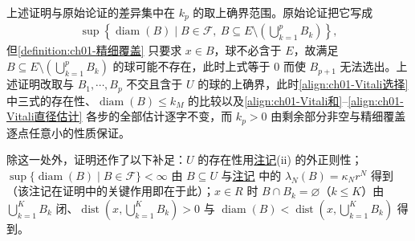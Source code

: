 \documentclass[../../main.tex]{subfiles}%
\begin{document}
\begin{remark}\label{remark:ch01-Vitali证明说明}
上述证明与原始论证的差异集中在 $k_p$ 的取上确界范围。原始论证把它写成
\begin{align*}
\sup\left\{\operatorname{diam}(B)\mid B\in\mathcal{F},\ B\subseteq E\setminus\left(\bigcup_{k=1}^pB_k\right)\right\},
\end{align*}
但\cref{definition:ch01-精细覆盖} 只要求 $x\in B$，球不必含于 $E$，故满足 $B\subseteq E\setminus(\bigcup_{k=1}^pB_k)$ 的球可能不存在，此时上式等于 $0$ 而使 $B_{p+1}$ 无法选出。上述证明改取与 $B_1,\cdots ,B_p$ 不交且含于 $U$ 的球的上确界，此时\eqref{align:ch01-Vitali选择} 中三式的存在性、$\operatorname{diam}(B)\leqslant k_M$ 的比较以及\eqref{align:ch01-Vitali和}--\eqref{align:ch01-Vitali直径估计} 各步的全部估计逐字不变，而 $k_p>0$ 由剩余部分非空与精细覆盖逐点任意小的性质保证。

除这一处外，证明还作了以下补足：$U$ 的存在性用\hyperref[remark:ch01-Lebesgue性质]{注记}(ii) 的外正则性；$\sup\{\operatorname{diam}(B)\mid B\in\mathcal{F}\}<\infty$ 由 $B\subseteq U$ 与\hyperref[remark:ch01-位似]{注记} 中的 $\lambda_N(B)=\kappa_Nr^N$ 得到（该注记在证明中的关键作用即在于此）；$x\in R$ 时 $B\cap B_k=\varnothing$（$k\leqslant K$）由 $\bigcup_{k=1}^KB_k$ 闭、$\operatorname{dist}(x,\bigcup_{k=1}^KB_k)>0$ 与 $\operatorname{diam}(B)<\operatorname{dist}(x,\bigcup_{k=1}^KB_k)$ 得到。
\end{remark}
\end{document}
